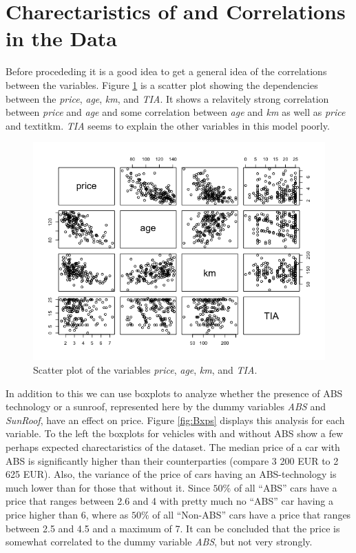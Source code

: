 \section{Charectaristics of and Correlations in the Data} %
\label{sec:need_name}

Before procededing it is a good idea to get a general idea of the correlations between the variables. Figure \ref{fig:Scatter} is a scatter plot showing the dependencies between the \textit{price}, \textit{age}, \textit{km}, and \textit{TIA}. It shows a relavitely strong correlation between \textit{price} and \textit{age} and some correlation between \textit{age} and \textit{km} as well as \textit{price} and textit{km}. \textit{TIA} seems to explain the other variables in this model poorly.

\begin{figure}[H]
  \begin{center}
    \includegraphics[scale=0.7]{./img/Scatter.png}
    \end{center}
  \caption{Scatter plot of the variables \textit{price}, \textit{age}, \textit{km}, and \textit{TIA}.}
  \label{fig:Scatter}
\end{figure}

\noindent
In addition to this we can use boxplots to analyze whether the presence of ABS technology or a sunroof, represented here by the dummy variables \textit{ABS} and \textit{SunRoof}, have an effect on price. Figure \ref{fig:Bxps} displays this analysis for each variable. To the left the boxplots for vehicles with and without ABS show a few perhaps expected charectaristics of the dataset. The median price of a car with ABS is significantly higher than their counterparties (compare 3 200 EUR to 2 625 EUR). Also, the variance of the price of cars having an ABS-technology is much lower than for those that without it. Since $50\%$ of all ``ABS'' cars have a price that ranges between 2.6 and 4 with pretty much no ``ABS'' car having a price higher than 6, where as $50\%$ of all ``Non-ABS'' cars have a price that ranges between 2.5 and 4.5 and a maximum of 7. It can be concluded that the price is somewhat correlated to the dummy variable \textit{ABS}, but not very strongly.

